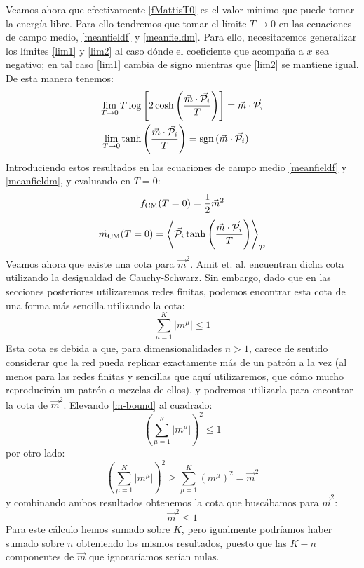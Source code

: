 \documentclass[titlepage,12pt]{article}
\numberwithin{equation}{section}
\begin{document}
	Veamos ahora que efectivamente \eqref{fMattisT0} es el valor mínimo que puede tomar la energía libre. Para ello tendremos que tomar el límite $T\rightarrow0$ en las ecuaciones de campo medio, \eqref{meanfieldf} y \eqref{meanfieldm}. Para ello, necesitaremos generalizar los límites \eqref{lim1} y \eqref{lim2} al caso dónde el coeficiente que acompaña a $x$ sea negativo; en tal caso \eqref{lim1} cambia de signo mientras que \eqref{lim2} se mantiene igual. De esta manera tenemos:
	\begin{align*}
	\lim_{T\rightarrow0}T\log&\left[2\cosh\left(\frac{\vec{m}\cdot\vec{\mathcal{P}_i}}{T}\right)\right]=\vec{m}\cdot\vec{\mathcal{P}_i} \\
	\lim_{T\rightarrow0}\tanh&\left(\frac{\vec{m}\cdot\vec{\mathcal{P}_i}}{T}\right)=\textnormal{sgn}\,(\vec{m}\cdot\vec{\mathcal{P}_i})
	\end{align*}
	Introduciendo estos resultados en las ecuaciones de campo medio \eqref{meanfieldf} y \eqref{meanfieldm}, y evaluando en $T=0$:
	\begin{equation}
	f_{\textnormal{CM}}(T=0)=\frac{1}{2}\vec{m}^2
	\label{fgs}
	\end{equation}
	\begin{equation}
	\vec{m}_{\textnormal{CM}}(T=0)=\left<\vec{\mathcal{P}_i}\tanh\left(\frac{\vec{m}\cdot\vec{\mathcal{P}_i}}{T}\right)\right>_{\mathcal{P}}
	\label{mgs}
	\end{equation}
	Veamos ahora que existe una cota para $\vec{m}^2$. Amit et. al. \cite{amit1} encuentran dicha cota utilizando la desigualdad de Cauchy-Schwarz. Sin embargo, dado que en las secciones posteriores utilizaremos redes finitas, podemos encontrar esta cota de una forma más sencilla utilizando la cota:
	\begin{equation}
	\sum_{\mu=1}^K |m^\mu|\leq 1
	\label{m-bound}
	\end{equation}
	Esta cota es debida a que, para dimensionalidades $n>1$, carece de sentido considerar que la red pueda replicar exactamente más de un patrón a la vez (al menos para las redes finitas y sencillas que aquí utilizaremos, que cómo mucho reproducirán un patrón o mezclas de ellos), y podremos utilizarla para encontrar la cota de $\vec{m}^2$. Elevando \eqref{m-bound} al cuadrado: 
	\begin{displaymath}
	\left(\sum_{\mu=1}^K |m^\mu|\right)^2\leq 1
	\end{displaymath}
	por otro lado:
	\begin{displaymath}
	\left(\sum_{\mu=1}^K |m^\mu|\right)^2\geq\sum_{\mu=1}^K (m^\mu)^2=\vec{m}^2
	\end{displaymath}
	y combinando ambos resultados obtenemos la cota que buscábamos para $\vec{m}^2$:
	\begin{displaymath}
	\vec{m}^2\leq 1
	\end{displaymath}
	Para este cálculo hemos sumado sobre $K$, pero igualmente podríamos haber sumado sobre $n$ obteniendo los mismos resultados, puesto que las $K-n$ componentes de $\vec{m}$ que ignoraríamos serían nulas.
	\\
	
\end{document}
